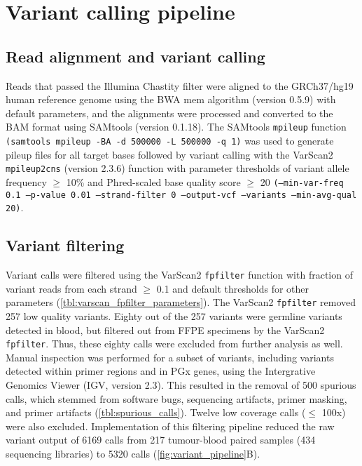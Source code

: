 \section{Variant calling pipeline}
\label{sec:Variantcallingpipeline}

\subsection{Read alignment and variant calling}

Reads that passed the Illumina Chastity filter were aligned to the GRCh37/hg19 human reference genome using the BWA mem algorithm (version 0.5.9) with default parameters, and the alignments were processed and converted to the BAM format using SAMtools (version 0.1.18). The SAMtools \texttt{mpileup} function \texttt{(samtools mpileup -BA -d 500000 -L 500000 -q 1)} was used to generate pileup files for all target bases followed by variant calling with the VarScan2 \texttt{mpileup2cns} (version 2.3.6) function with parameter thresholds of variant allele frequency $\geq$ 10\% and Phred-scaled base quality score $\geq$ 20 \texttt{(--min-var-freq 0.1 --p-value 0.01 --strand-filter 0 --output-vcf --variants --min-avg-qual 20)}.

\subsection{Variant filtering}

Variant calls were filtered using the VarScan2 \texttt{fpfilter} function with fraction of variant reads from each strand $\geq$ 0.1 and default thresholds for other parameters (\autoref{tbl:varscan_fpfilter_parameters}). The VarScan2 \texttt{fpfilter} removed 257 low quality variants. Eighty out of the 257 variants were germline variants detected in blood, but filtered out from FFPE specimens by the VarScan2 \texttt{fpfilter}. Thus, these eighty calls were excluded from further analysis as well. Manual inspection was performed for a subset of variants, including variants detected within primer regions and in PGx genes, using the Intergrative Genomics Viewer (IGV, version 2.3). This resulted in the removal of 500 spurious calls, which stemmed from software bugs, sequencing artifacts, primer masking, and primer artifacts (\autoref{tbl:spurious_calls}). Twelve low coverage calls ($\leq$ 100x) were also excluded. Implementation of this filtering pipeline reduced the raw variant output of 6169 calls from 217 tumour-blood paired samples (434 sequencing libraries) to 5320 calls (\autoref{fig:variant_pipeline}B).

